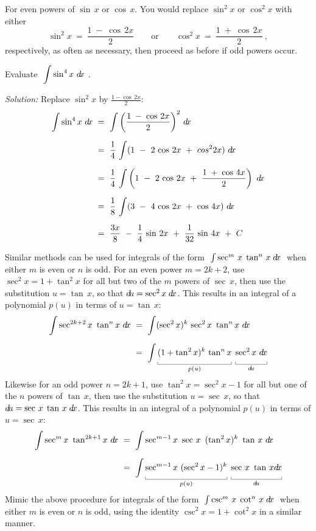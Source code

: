 \divider
\vspace{2mm}
For even powers of $\sin\,x$ or $\cos\,x$. You would replace $\sin^2 x$ or
$\cos^2 x$ with either
\[
\sin^2 x ~=~ \frac{1 \;-\; \cos\,2x}{2} \quad\quad\text{or}\quad\quad
\cos^2 x ~=~ \frac{1 \;+\; \cos\,2x}{2} ~,
\]
respectively, as often as necessary, then proceed as before if odd powers occur.

\begin{exmp}\label{exmp:trigint4}
\noindent Evaluate $~\displaystyle\int \sin^4 x ~d\!x~$.\vspace{1mm}
\par\noindent\emph{Solution:} Replace $\sin^2 x$ by $\frac{1 - \cos\,2x}{2}$:
\begin{align*}
\int \sin^4 x~d\!x ~&=~ \int \left(\frac{1 \;-\; \cos\,2x}{2}\right)^2 \,d\!x\\[6pt]
&=~ \frac{1}{4}\,\int (1 ~-~ 2\,\cos\,2x ~+~ cos^2 2x)~d\!x\\[6pt]
&=~ \frac{1}{4}\,\int \left(1 ~-~ 2\,\cos\,2x ~+~ \frac{1 \;+\; \cos\,4x}{2}\right)~d\!x\\[6pt]
&=~ \frac{1}{8}\,\int (3 ~-~ 4\,\cos\,2x ~+~ \cos\,4x)~d\!x\\[6pt]
&=~ \frac{3x}{8} ~-~ \frac{1}{4}\,\sin\,2x ~+~ \frac{1}{32}\,\sin\,4x ~+~ C
\end{align*}
\end{exmp}
\divider
\newpage
Similar methods can be used for integrals of the form
$\;\int \sec^m\,x\;\tan^n\,x\;d\!x\;$ when either $m$ is even or $n$ is odd. For
an even power $m = 2k+2$, use $\sec^2 x = 1 + \tan^2 x$ for all but two of the
$m$ powers of $\sec\,x$, then use the substitution $u=\tan\,x$, so that
$d\!u=\sec^2 x\;d\!x$. This results in an integral of a polynomial $p(u)$ in terms
of $u=\tan\,x$:
\begin{align*}
\int \sec^{2k+2} x ~\tan^n x~\dx ~&=~ \int (\sec^2 x)^k \,\sec^2 x~\tan^n x~\dx\\[6pt]
&=~ \int \underbracket[0.3pt]{(1 + \tan^2 x)^k\,\tan^n x\vphantom{\frac{1}{2}}}_{p(u)}
\;\underbracket[0.3pt]{\sec^2 x~\dx\vphantom{\frac{1}{2}}}_{\du}
\end{align*}
Likewise for an odd power $n=2k+1$, use $\tan^2 x = \sec^2 x - 1$ for all but
one of the $n$ powers of $\tan\,x$, then use the substitution $u=\sec\,x$, so
that $d\!u=\sec\,x\;\tan\,x\;d\!x$. This results in an integral of a polynomial
$p(u)$ in terms of $u=\sec\,x$:
\begin{align*}
\int \sec^m x ~\tan^{2k+1} x~\dx ~&=~ \int \sec^{m-1} x~\sec\,x \,~(\tan^2 x)^k ~\tan\,x~\dx\\[6pt]
&=~ \int \underbracket[0.3pt]{\sec^{m-1} x~(\sec^2 x - 1)^k\vphantom{\frac{1}{2}}}_{p(u)}
\;\underbracket[0.3pt]{\sec\,x~\tan\,x\dx\vphantom{\frac{1}{2}}}_{\du}
\end{align*}
Mimic the above procedure for integrals of the form
$\;\int \csc^m\,x\;\cot^n\,x\;d\!x\;$ when either $m$ is even or $n$ is odd,
using the identity $\csc^2 x = 1 + \cot^2 x$ in a similar manner.

